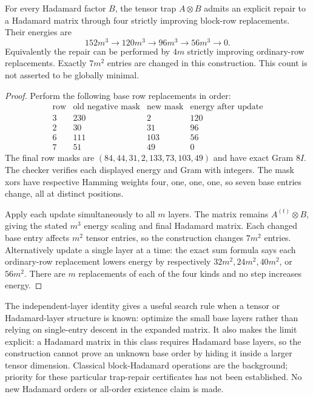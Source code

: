 \begin{theorem}
\label{thm:exchanges-four-row-repair}
For every Hadamard factor $B$, the tensor trap $A\otimes B$ admits an
explicit repair to a Hadamard matrix through four strictly improving
block-row replacements. Their energies are
\[
 152m^3\to120m^3\to96m^3\to56m^3\to0.
\]
Equivalently the repair can be performed by $4m$ strictly improving
ordinary-row replacements. Exactly $7m^2$ entries are changed in this
construction. This count is not asserted to be globally minimal.
\end{theorem}
\begin{proof}
Perform the following base row replacements in order:
\[
 \begin{array}{c|c|c|c}
 \text{row}&\text{old negative mask}&\text{new mask}&\text{energy after update}\\\hline
 3&230&2&120\\
 2&30&31&96\\
 6&111&103&56\\
 7&51&49&0
 \end{array}
\]
The final row masks are
$(84,44,31,2,133,73,103,49)$ and have exact Gram $8I$.
The checker verifies each displayed energy and Gram with integers.
The mask xors have respective Hamming weights four, one, one, one,
so seven base entries change, all at distinct positions.

Apply each update simultaneously to all $m$ layers. The matrix remains
$A^{(t)}\otimes B$, giving the stated $m^3$ energy scaling and final
Hadamard matrix. Each changed base entry affects $m^2$ tensor entries,
so the construction changes $7m^2$ entries. Alternatively update a single
layer at a time: the exact sum formula says each ordinary-row replacement
lowers energy by respectively $32m^2,24m^2,40m^2$, or $56m^2$.
There are $m$ replacements of each of the four kinds and no step
increases energy.
\end{proof}

The independent-layer identity gives a useful search rule when a tensor
or Hadamard-layer structure is known: optimize the small base layers
rather than relying on single-entry descent in the expanded matrix.
It also makes the limit explicit: a Hadamard matrix in this class
requires Hadamard base layers, so the construction cannot prove an
unknown base order by hiding it inside a larger tensor dimension.
Classical block-Hadamard operations are the background; priority for
these particular trap-repair certificates has not been established.
No new Hadamard orders or all-order existence claim is made.
